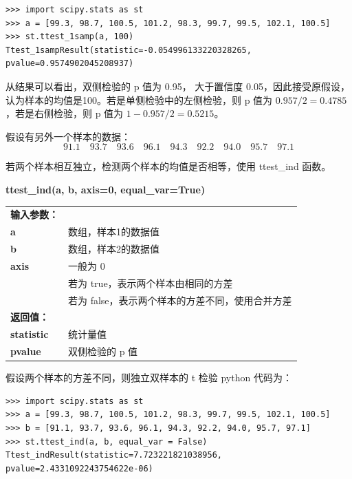 \begin{lstlisting}[Language=Python]
>>> import scipy.stats as st
>>> a = [99.3, 98.7, 100.5, 101.2, 98.3, 99.7, 99.5, 102.1, 100.5]
>>> st.ttest_1samp(a, 100)
Ttest_1sampResult(statistic=-0.054996133220328265, pvalue=0.9574902045208937)
\end{lstlisting}

从结果可以看出，双侧检验的 p 值为 0.95， 大于置信度 0.05，因此接受原假设，认为样本的均值是100。若是单侧检验中的左侧检验，则 p 值为 $0.957/2=0.4785$，若是右侧检验，则 p 值为 $1-0.957/2=0.5215$。

假设有另外一个样本的数据：
\begin{equation}
91.1\quad 93.7\quad 93.6\quad 96.1\quad 94.3\quad
       92.2\quad 94.0\quad 95.7\quad 97.1 \nonumber
\end{equation}

若两个样本相互独立，检测两个样本的均值是否相等，使用 ttest\_ind 函数。

\begin{center}
\begin{tcolorbox}[title = ttest\_ind 函数的语法]
\textbf{ttest\_ind(a, b, axis=0, equal\_var=True) }
\tcblower
\vspace{2pt}
\begin{tcboutputlisting}
\begin{tabular}{>{\bfseries}ll}
  输入参数：&\\
  a &数组，样本1的数据值\\
  b &数组，样本2的数据值\\
  axis & 一般为 0\\
  \multirow{2}{*}{equal\_var} & 若为 true，表示两个样本由相同的方差\\
  &若为 false，表示两个样本的方差不同，使用合并方差\\
\specialrule{0em}{2pt}{2pt}
返回值：&\\
statistic & 统计量值\\
pvalue & 双侧检验的 p 值
\end{tabular}
\end{tcboutputlisting}
\tcbuselistingtext
\end{tcolorbox}
\end{center}

假设两个样本的方差不同，则独立双样本的 t 检验 python 代码为：

\begin{lstlisting}[Language=Python]
>>> import scipy.stats as st
>>> a = [99.3, 98.7, 100.5, 101.2, 98.3, 99.7, 99.5, 102.1, 100.5]
>>> b = [91.1, 93.7, 93.6, 96.1, 94.3, 92.2, 94.0, 95.7, 97.1]
>>> st.ttest_ind(a, b, equal_var = False)
Ttest_indResult(statistic=7.723221821038956, pvalue=2.4331092243754622e-06)
\end{lstlisting}

